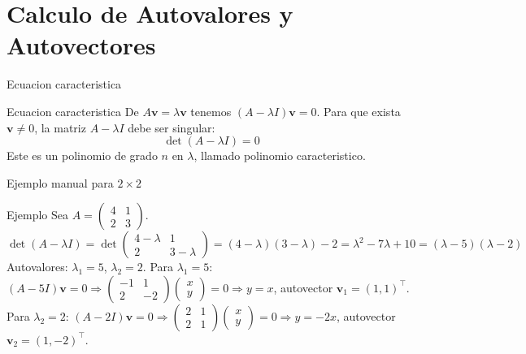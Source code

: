 \documentclass[aspectratio=169, 10pt, xcolor=table]{beamer}
\begin{document}
\section{Calculo de Autovalores y Autovectores}

\begin{frame}{Ecuacion caracteristica}
    \begin{block}{Ecuacion caracteristica}
        De $A\mathbf{v}=\lambda\mathbf{v}$ tenemos $(A-\lambda I)\mathbf{v}=0$. Para que exista $\mathbf{v}\neq0$, la matriz $A-\lambda I$ debe ser singular:
        \[
        \det(A-\lambda I)=0
        \]
        Este es un polinomio de grado $n$ en $\lambda$, llamado polinomio caracteristico.
    \end{block}
\end{frame}

\begin{frame}{Ejemplo manual para $2\times2$}
    \begin{exampleblock}{Ejemplo}
        Sea $A = \begin{pmatrix}4&1\\2&3\end{pmatrix}$.
        \[
        \det(A-\lambda I) = \det\begin{pmatrix}4-\lambda&1\\2&3-\lambda\end{pmatrix} = (4-\lambda)(3-\lambda)-2 = \lambda^2 -7\lambda +10 = (\lambda-5)(\lambda-2)
        \]
        Autovalores: $\lambda_1=5$, $\lambda_2=2$.
        \vspace{0.2cm}
        Para $\lambda_1=5$: $(A-5I)\mathbf{v}=0 \Rightarrow \begin{pmatrix}-1&1\\2&-2\end{pmatrix}\begin{pmatrix}x\\y\end{pmatrix}=0 \Rightarrow y=x$, autovector $\mathbf{v}_1=(1,1)^\top$.
        Para $\lambda_2=2$: $(A-2I)\mathbf{v}=0 \Rightarrow \begin{pmatrix}2&1\\2&1\end{pmatrix}\begin{pmatrix}x\\y\end{pmatrix}=0 \Rightarrow y=-2x$, autovector $\mathbf{v}_2=(1,-2)^\top$.
    \end{exampleblock}
\end{frame}
\end{document}
